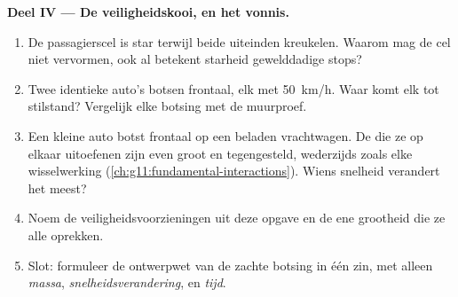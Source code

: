 \begin{problem}
\medskip
\noindent\textbf{Deel IV --- De veiligheidskooi, en het vonnis.}
\begin{enumerate}[resume]
  \item De passagierscel is star terwijl beide uiteinden kreukelen.
        Waarom mag de cel niet vervormen, ook al betekent starheid
        gewelddadige stops?
  \item Twee identieke auto's botsen frontaal, elk met \qty{50}{km/h}.
        Waar komt elk tot stilstand? Vergelijk elke botsing met de
        muurproef.
  \item Een kleine auto botst frontaal op een beladen vrachtwagen. De
         die ze op elkaar uitoefenen zijn even groot en
        tegengesteld, wederzijds zoals elke wisselwerking
        (\cref{ch:g11:fundamental-interactions}). Wiens snelheid
        verandert het meest?
  \item Noem de veiligheidsvoorzieningen uit deze opgave en de ene
        grootheid die ze alle oprekken.
  \item Slot: formuleer de ontwerpwet van de zachte botsing in één zin,
        met alleen \emph{massa}, \emph{snelheidsverandering},
        \emph{} en \emph{tijd}.
\end{enumerate}
\end{problem}
